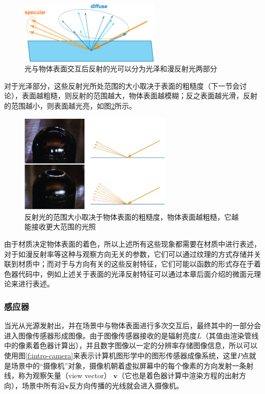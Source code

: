 \begin{figure}
\sidecaption
	\includegraphics[width=0.6\textwidth]{figures/intro/ray-optics-6}
	\caption{光与物体表面交互后反射的光可以分为光泽和漫反射光两部分}
	\label{f:intro-specular-and-diffuse}
\end{figure}

对于光泽部分，这些反射光所处范围的大小取决于表面的粗糙度（下一节会讨论），表面越粗糙，则反射的范围越大，物体表面越模糊；反之表面越光滑，反射的范围越小，则表面越光亮，如图\ref{f:intro-roughness}所示。

\begin{figure}
\sidecaption
	\includegraphics[width=0.65\textwidth]{figures/intro/ray-optics-2}
	\caption{反射光的范围大小取决于物体表面的粗糙度，物体表面越粗糙，它越能接收更大范围的光照}
	\label{f:intro-roughness}
\end{figure}

由于材质决定物体表面的着色，所以上述所有这些现象都需要在材质中进行表述，对于如漫反射率等这种与观察方向无关的参数，它们可以通过纹理的方式存储并关联到材质中；而对于与方向有关的这些反射特征，它们可能以函数的形式存在于着色器代码中，例如上述关于表面的光泽反射特征可以通过本章后面介绍的微面元理论来进行表述。





\subsubsection{感应器}\label{sec:intro-sensor}
当光从光源发射出，并在场景中与物体表面进行多次交互后，最终其中的一部分会进入图像传感器形成图像。由于图像传感器接收的是辐射亮度$L$（其值由渲染管线中的像素着色器计算出），并且数字图像以一定的分辨率存储图像信息，所以可以使用图\ref{f:intro-camera}来表示计算机图形学中的图形传感器成像系统，这里$P$点就是场景中的“摄像机”对象，摄像机朝着虚拟屏幕中的每个像素的方向发射一条射线，称为观察矢量（view vector） $\mathbf{v}$（它也是着色器计算中渲染方程的出射方向），场景中所有沿$\mathbf{v}$反方向传播的光线就会进入摄像机。

